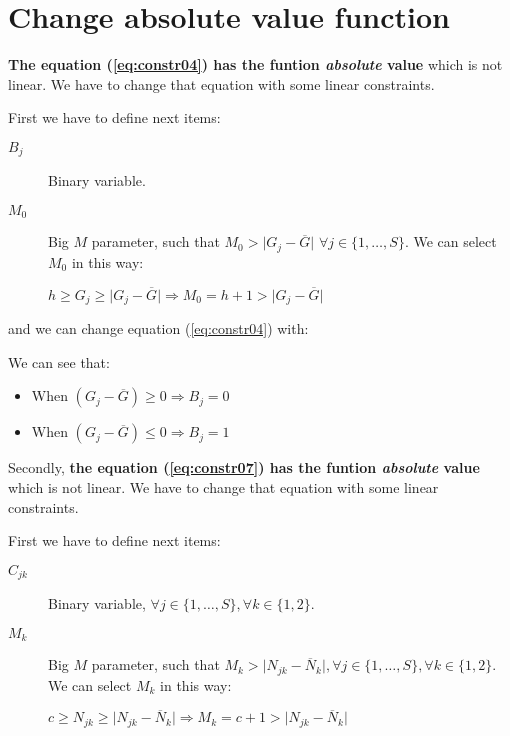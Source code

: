 \documentclass[a4paper,12pt]{article}
\begin{document}


\section{Change absolute value function}\label{sec:absolute}

\textbf{The equation (\ref{eq:constr04}) has the funtion \textit{absolute} value} which is not linear. We have to change that equation with some linear constraints.

First we have to define next items:
\begin{description}
	\item[$B_j$] Binary variable.
	\item[$M_0$] Big $M$ parameter, such that $M_0 > \lvert G_j - \overline{G} \rvert$  $\forall j \in \{1, \ldots, S\}$. We can select $M_0$ in this way: 
	
	$h \ge G_j \ge \lvert G_j - \overline{G} \rvert \Rightarrow M_0 = h+1 > \lvert G_j -  \overline{G} \rvert$
\end{description}

and we can change equation (\ref{eq:constr04}) with:
\begin{lpformulation}
\end{lpformulation}
We can see that:
\begin{itemize}
	\item When $(G_j - \overline{G}) \ge 0 \Longrightarrow B_j = 0$
	\item When $(G_j - \overline{G}) \le 0 \Longrightarrow B_j = 1$
\end{itemize}


Secondly, \textbf{the equation (\ref{eq:constr07}) has the funtion \textit{absolute} value} which is not linear. We have to change that equation with some linear constraints.

First we have to define next items:
\begin{description}
	\item[$C_{jk}$] Binary variable, $\forall j \in \{1, \ldots, S\}, \forall k \in \{1, 2\}$.
	\item[$M_k$] Big $M$ parameter, such that $M_k > \lvert N_{jk} - \overline{N}_k \rvert, \forall j \in \{1, \ldots, S\}, \forall k \in \{1, 2\}$. We can select $M_k$ in this way: 
	
	$c \ge N_{jk} \ge \lvert N_{jk} - \overline{N}_k \rvert \Rightarrow M_k = c+1 > \lvert N_{jk} - \overline{N}_k \rvert$
\end{description}
\end{document}
